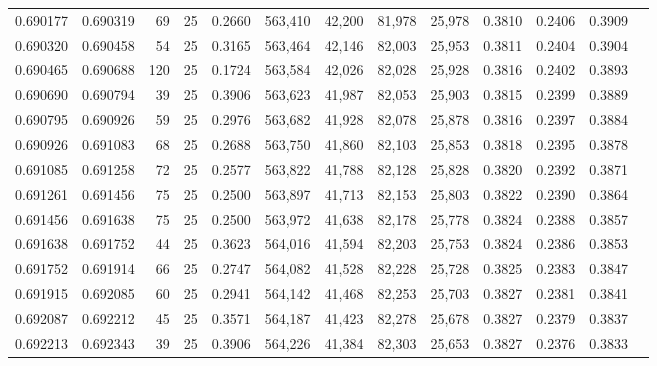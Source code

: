 \begin{tabular}{rrrrrrrrrrrrr}
0.690177 & 0.690319 &    69 &  25 &                                     0.2660 & 563,410 &  42,200 &  81,978 &  25,978 & 0.3810 & 0.2406 & 0.3909 \\
0.690320 & 0.690458 &    54 &  25 &                                     0.3165 & 563,464 &  42,146 &  82,003 &  25,953 & 0.3811 & 0.2404 & 0.3904 \\
0.690465 & 0.690688 &   120 &  25 &                                     0.1724 & 563,584 &  42,026 &  82,028 &  25,928 & 0.3816 & 0.2402 & 0.3893 \\
0.690690 & 0.690794 &    39 &  25 &                                     0.3906 & 563,623 &  41,987 &  82,053 &  25,903 & 0.3815 & 0.2399 & 0.3889 \\
0.690795 & 0.690926 &    59 &  25 &                                     0.2976 & 563,682 &  41,928 &  82,078 &  25,878 & 0.3816 & 0.2397 & 0.3884 \\
0.690926 & 0.691083 &    68 &  25 &                                     0.2688 & 563,750 &  41,860 &  82,103 &  25,853 & 0.3818 & 0.2395 & 0.3878 \\
0.691085 & 0.691258 &    72 &  25 &                                     0.2577 & 563,822 &  41,788 &  82,128 &  25,828 & 0.3820 & 0.2392 & 0.3871 \\
0.691261 & 0.691456 &    75 &  25 &                                     0.2500 & 563,897 &  41,713 &  82,153 &  25,803 & 0.3822 & 0.2390 & 0.3864 \\
0.691456 & 0.691638 &    75 &  25 &                                     0.2500 & 563,972 &  41,638 &  82,178 &  25,778 & 0.3824 & 0.2388 & 0.3857 \\
0.691638 & 0.691752 &    44 &  25 &                                     0.3623 & 564,016 &  41,594 &  82,203 &  25,753 & 0.3824 & 0.2386 & 0.3853 \\
0.691752 & 0.691914 &    66 &  25 &                                     0.2747 & 564,082 &  41,528 &  82,228 &  25,728 & 0.3825 & 0.2383 & 0.3847 \\
0.691915 & 0.692085 &    60 &  25 &                                     0.2941 & 564,142 &  41,468 &  82,253 &  25,703 & 0.3827 & 0.2381 & 0.3841 \\
0.692087 & 0.692212 &    45 &  25 &                                     0.3571 & 564,187 &  41,423 &  82,278 &  25,678 & 0.3827 & 0.2379 & 0.3837 \\
0.692213 & 0.692343 &    39 &  25 &                                     0.3906 & 564,226 &  41,384 &  82,303 &  25,653 & 0.3827 & 0.2376 & 0.3833 \\

\end{tabular}
